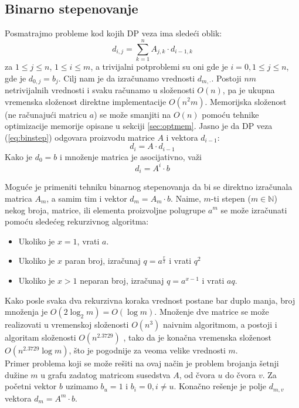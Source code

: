 \documentclass[a4paper,12pt]{article}
\numberwithin{equation}{subsection}
\begin{document}
\subsection{Binarno stepenovanje}

Posmatrajmo probleme kod kojih DP veza ima slede\' ci oblik:
\begin{equation} \label{eq:binstep}
	d_{i, j} = \sum_{k=1}^{n} A_{j, k} \cdot d_{i-1, k}
\end{equation}
za $1 \leq j \leq n$, $1 \leq i \leq m$, a trivijalni potproblemi su oni gde je $i=0, 1 \leq j \leq n$, gde je $d_{0, j} = b_j$. Cilj nam je da izra\v cunamo vrednosti $d_{m, \cdot}$. Postoji $nm$ netrivijalnih vrednosti i svaku ra\v cunamo u slo\v zenosti $O(n)$, pa je ukupna vremenska slo\v zenost direktne implementacije $O(n^2 m)$. Memorijska slo\v zenost (ne ra\v cunaju\' ci matricu $a$) se mo\v ze smanjiti na $O(n)$ pomo\' cu tehnike optimizacije memorije opisane u sekciji \ref{sec:optmem}. Jasno je da DP veza (\ref{eq:binstep}) odgovara proizvodu matrice $A$ i vektora $d_{i-1}$:
$$
	d_i = A \cdot d_{i-1}
$$
Kako je $d_0 = b$ i mno\v zenje matrica je asocijativno, va\v zi
$$
	d_i = A^i \cdot b
$$

Mogu\' ce je primeniti tehniku binarnog stepenovanja da bi se direktno izra\v cunala matrica $A_m$, a samim tim i vektor $d_m = A_m \cdot b$. Naime, $m$-ti stepen ($m \in \mathbb{N}$) nekog broja, matrice, ili elementa proizvoljne polugrupe $a^m$ se mo\v ze izra\v cunati pomo\' cu slede\' ceg rekurzivnog algoritma:

\begin{itemize}
\item Ukoliko je $x=1$, vrati $a$.
\item Ukoliko je $x$ paran broj, izra\v cunaj $q = a^\frac{x}{2}$ i vrati $q^2$
\item Ukoliko je $x>1$ neparan broj, izra\v cunaj $q = a^{x-1}$ i vrati $aq$.
\end{itemize}

Kako posle svaka dva rekurzivna koraka vrednost postane bar duplo manja, broj mno\v zenja je $O(2 \log_2m) = O(\log m)$. Mno\v zenje dve matrice se mo\v ze realizovati u vremenskoj slo\v zenosti $O(n^3)$ naivnim algoritmom, a postoji i algoritam slo\v zenosti $O(n^{2.3729})$ \cite{matrixmul}, tako da je kona\v cna vremenska slo\v zenost $O(n^{2.3729} \log m)$, \v sto je pogodnije za veoma velike vrednosti $m$.
\\

Primer problema koji se mo\v ze re\v siti na ovaj na\v cin je problem brojanja \v setnji du\v zine $m$ u grafu zadatog matricom susedstva $A$, od \v cvora $u$ do \v cvora $v$. Za po\v cetni vektor $b$ uzimamo $b_u = 1$ i $b_i = 0, i \neq u$. Kona\v cno re\v senje je polje $d_{m, v}$ vektora $d_m = A^m \cdot b$.
\end{document}
